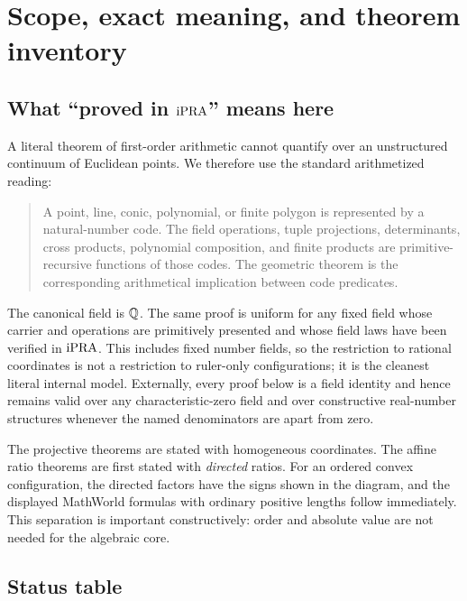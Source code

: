 \section{Scope, exact meaning, and theorem inventory}

\subsection{What ``proved in \texorpdfstring{$\mathrm{iPRA}$}{iPRA}'' means here}

A literal theorem of first-order arithmetic cannot quantify over an unstructured continuum of Euclidean points.  We therefore use the standard arithmetized reading:

\begin{quote}
A point, line, conic, polynomial, or finite polygon is represented by a natural-number code.  The field operations, tuple projections, determinants, cross products, polynomial composition, and finite products are primitive-recursive functions of those codes.  The geometric theorem is the corresponding arithmetical implication between code predicates.
\end{quote}

The canonical field is $\mathbb Q$.  The same proof is uniform for any fixed field whose carrier and operations are primitively presented and whose field laws have been verified in $\mathrm{iPRA}$.  This includes fixed number fields, so the restriction to rational coordinates is not a restriction to ruler-only configurations; it is the cleanest literal internal model.  Externally, every proof below is a field identity and hence remains valid over any characteristic-zero field and over constructive real-number structures whenever the named denominators are apart from zero.

The projective theorems are stated with homogeneous coordinates.  The affine ratio theorems are first stated with \emph{directed} ratios.  For an ordered convex configuration, the directed factors have the signs shown in the diagram, and the displayed MathWorld formulas with ordinary positive lengths follow immediately.  This separation is important constructively: order and absolute value are not needed for the algebraic core.

\subsection{Status table}

